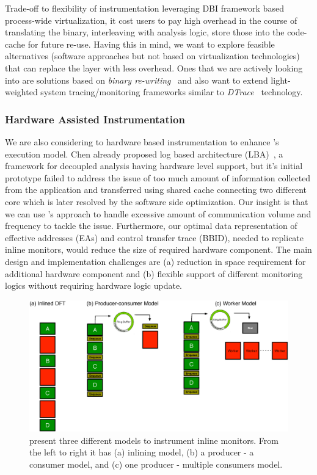 Trade-off to flexibility of instrumentation leveraging DBI framework based
process-wide virtualization, it cost users to pay high overhead in the course
of translating the binary, interleaving with analysis logic, store those into
the code-cache for future re-use. Having this in mind, we want to explore
feasible alternatives (software approaches but not based on virtualization
technologies) that can replace the layer with less overhead. Ones that we are
actively looking into are solutions based on {\it binary re-writing}~\cite{cfi,
brewriting:usenix2003} and also want to extend light-weighted system
tracing/monitoring frameworks similar to {\it DTrace}~\cite{DTrace} technology.

\subsubsection{Hardware Assisted Instrumentation} 
\label{ssec:hw_inst}

We are also considering to hardware based instrumentation to enhance
\sreplica's execution model. Chen \etal already proposed log based architecture
(LBA)~\cite{lba:isca2008}, a framework for decoupled analysis having hardware
level support, but it's initial prototype failed to address the issue of too
much amount of information collected from the application and transferred using
shared cache connecting two different core which is later resolved by the
software side optimization. 
%
Our insight is that we can use \sreplica's approach to handle excessive amount
of communication volume and frequency to tackle the issue. Furthermore, our
optimal data representation of effective addresses (EAs) and control transfer
trace (BBID), needed to replicate inline monitors, would reduce the size of
required hardware component.
%
The main design and implementation challenges are (a) reduction in space
requirement for additional hardware component and (b) flexible support of
different monitoring logics without requiring hardware logic update.


\begin{figure}[tb]
    \centering
    \includegraphics[width=0.90\linewidth]{figs/model0.eps}

    \caption{present three different models to instrument inline monitors. From
    the left to right it has (a) inlining model, (b) a producer - a consumer
    model, and (c) one producer - multiple consumers model.\label{fig:model0}}

\end{figure}

